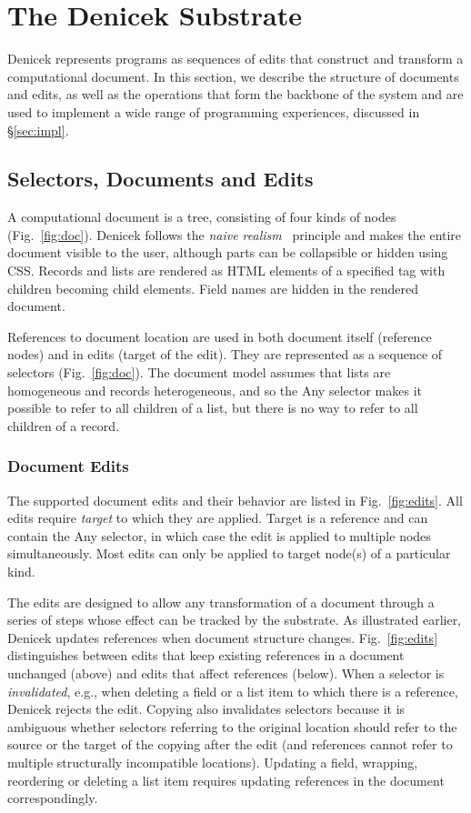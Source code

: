 \documentclass[sigconf]{acmart}
\newcommand{\ident}[1]{{\sffamily #1}}
\begin{document}
\section{The Denicek Substrate}
\label{sec:system}
Denicek represents programs as sequences of edits that construct and transform a computational
document. In this section, we describe the structure of documents and edits, as well as the
operations that form the backbone of the system and are used to implement a wide range of
programming experiences, discussed in \S\ref{sec:impl}.

\subsection{Selectors, Documents and Edits}
A computational document is a tree, consisting of four kinds of nodes (Fig.~\ref{fig:doc}).
Denicek follows the \emph{naive realism}~\cite{disessa-1986-boxer} principle and makes the entire
document visible to the user, although parts can be collapsible or hidden using CSS.
Records and lists are rendered as HTML elements of a specified tag with children becoming child
elements. Field names are hidden in the rendered document.

References to document location are used in both document itself (reference nodes) and in edits
(target of the edit). They are represented as a sequence of selectors (Fig.~\ref{fig:doc}).
The document model assumes that lists are homogeneous and records heterogeneous, and so the
\ident{Any} selector makes it possible to refer to all children of a list, but there is no
way to refer to all children of a record.

\subsubsection*{Document Edits}
The supported document edits and their behavior are listed in Fig.~\ref{fig:edits}. All edits
require \emph{target} to which they are applied. Target is a reference and can contain the
\ident{Any} selector, in which case the edit is applied to multiple nodes simultaneously.
Most edits can only be applied to target node(s) of a particular kind.

The edits are designed to allow any transformation of a document
through a series of steps whose effect can be tracked by the substrate. As illustrated earlier,
Denicek updates references when document structure changes. Fig.~\ref{fig:edits} distinguishes
between edits that keep existing references in a document unchanged (above) and edits that affect
references (below). When a selector is \emph{invalidated}, e.g., when deleting a field or a
list item to which there is a reference, Denicek rejects the edit. Copying also invalidates
selectors because it is ambiguous whether selectors referring to the original location should
refer to the source or the target of the copying after the edit (and references cannot refer to
multiple structurally incompatible locations). Updating a field, wrapping, reordering or deleting
a list item requires updating references in the document correspondingly.
\end{document}
